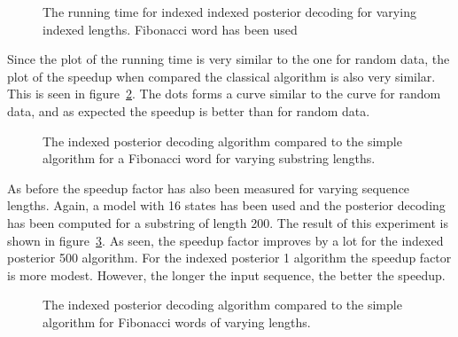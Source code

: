 \begin{figure}
  \centering
  
  \caption{The running time for indexed indexed posterior decoding for
    varying indexed lengths. Fibonacci word has been used}
  \label{fig:assymptotic_indexed_posterior_fib_subseq_length.tex}
\end{figure}

Since the plot of the running time is very similar to the one for random data,
the plot of the speedup when compared the classical algorithm is also very
similar. This is seen in
figure~\ref{fig:fib_indexed_posterior_speedup_vs_subseq}. The dots forms a
curve similar to the curve for random data, and as expected the speedup is
better than for random data.

\begin{figure}
  \centering
  
  \caption{The indexed posterior decoding algorithm compared to the simple
    algorithm for a Fibonacci word for varying substring lengths.}
  \label{fig:fib_indexed_posterior_speedup_vs_subseq}
\end{figure}

As before the speedup factor has also been measured for varying sequence
lengths. Again, a model with 16 states has been used and the posterior decoding
has been computed for a substring of length 200. The result of this experiment
is shown in figure~\ref{fig:indexed_posterior_fib_speedup_vs_T}. As seen, the
speedup factor improves by a lot for the indexed posterior 500 algorithm. For
the indexed posterior 1 algorithm the speedup factor is more modest. However,
the longer the input sequence, the better the speedup.

\begin{figure}
  \centering
  
  \caption{The indexed posterior decoding algorithm compared to the simple
    algorithm for Fibonacci words of varying lengths.}
  \label{fig:indexed_posterior_fib_speedup_vs_T}
\end{figure}

